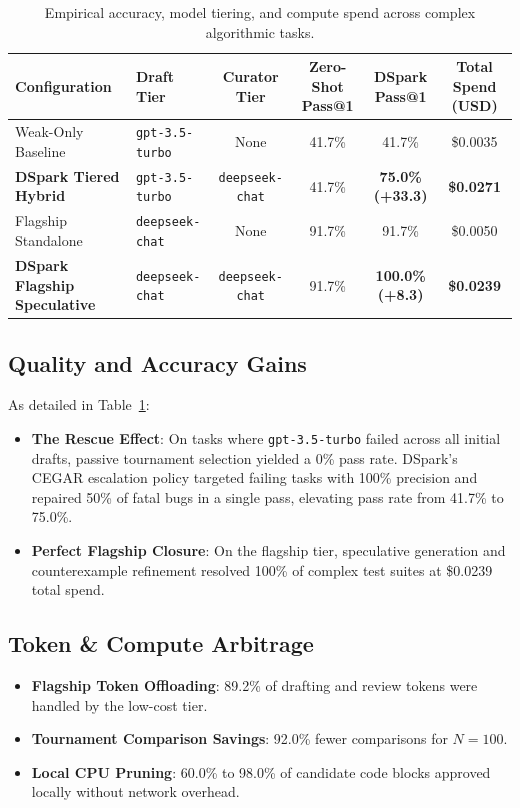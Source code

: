 \documentclass[10pt,twocolumn,letterpaper]{article}
\begin{document}
\begin{table}[t]
\centering
\small
\caption{Empirical accuracy, model tiering, and compute spend across complex algorithmic tasks.}
\label{tab:results}
\begin{tabular}{llcccc}
\toprule
\textbf{Configuration} & \textbf{Draft Tier} & \textbf{Curator Tier} & \textbf{Zero-Shot Pass@1} & \textbf{DSpark Pass@1} & \textbf{Total Spend (USD)} \\
\midrule
Weak-Only Baseline & \texttt{gpt-3.5-turbo} & None & 41.7\% & 41.7\% & \$0.0035 \\
\textbf{DSpark Tiered Hybrid} & \texttt{gpt-3.5-turbo} & \texttt{deepseek-chat} & 41.7\% & \textbf{75.0\% (+33.3)} & \textbf{\$0.0271} \\
Flagship Standalone & \texttt{deepseek-chat} & None & 91.7\% & 91.7\% & \$0.0050 \\
\textbf{DSpark Flagship Speculative} & \texttt{deepseek-chat} & \texttt{deepseek-chat} & 91.7\% & \textbf{100.0\% (+8.3)} & \textbf{\$0.0239} \\
\bottomrule
\end{tabular}
\end{table}

\subsection{Quality and Accuracy Gains}
As detailed in Table~\ref{tab:results}:
\begin{itemize}
    \item \textbf{The Rescue Effect}: On tasks where \texttt{gpt-3.5-turbo} failed across all initial drafts, passive tournament selection yielded a 0\% pass rate. DSpark's CEGAR escalation policy targeted failing tasks with 100\% precision and repaired 50\% of fatal bugs in a single pass, elevating pass rate from 41.7\% to 75.0\%.
    \item \textbf{Perfect Flagship Closure}: On the flagship tier, speculative generation and counterexample refinement resolved 100\% of complex test suites at \$0.0239 total spend.
\end{itemize}

\subsection{Token \& Compute Arbitrage}
\begin{itemize}
    \item \textbf{Flagship Token Offloading}: 89.2\% of drafting and review tokens were handled by the low-cost tier.
    \item \textbf{Tournament Comparison Savings}: 92.0\% fewer comparisons for $N=100$.
    \item \textbf{Local CPU Pruning}: 60.0\% to 98.0\% of candidate code blocks approved locally without network overhead.
\end{itemize}
\end{document}
